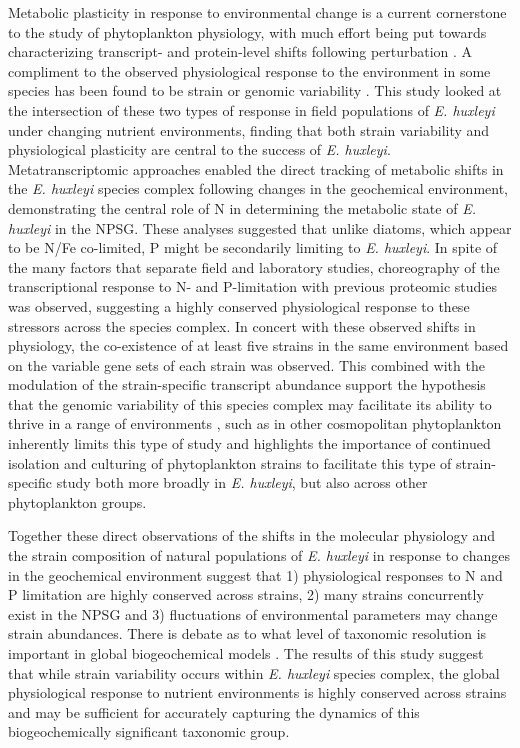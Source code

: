 Metabolic plasticity in response to environmental change is a current cornerstone to the study of phytoplankton physiology, with much effort being put towards characterizing transcript- and protein-level shifts following perturbation \citep{Dyhrman2006, Dyhrman2012, Wurch2011, Bertrand2012a, Jones2013, Bender2014, Frischkorn2014}. A compliment to the observed physiological response to the environment in some species has been found to be strain or genomic variability \citep{Kashtan2014}. This study looked at the intersection of these two types of response in field populations of \textit{E. huxleyi} under changing nutrient environments, finding that both strain variability and physiological plasticity are central to the success of \textit{E. huxleyi}. Metatranscriptomic approaches enabled the direct tracking of metabolic shifts in the \textit{E. huxleyi} species complex following changes in the geochemical environment, demonstrating the central role of N in determining the metabolic state of \textit{E. huxleyi} in the NPSG. These analyses suggested that unlike diatoms, which appear to be N/Fe co-limited, P might be secondarily limiting to \textit{E. huxleyi}. In spite of the many factors that separate field and laboratory studies, choreography of the transcriptional response to N- and P-limitation with previous proteomic studies \citep{McKew2015} was observed, suggesting a highly conserved physiological response to these stressors across the species complex. In concert with these observed shifts in physiology, the co-existence of at least five strains in the same environment based on the variable gene sets of each strain was observed. This combined with the modulation of the strain-specific transcript abundance support the hypothesis that the genomic variability of this species complex may facilitate its ability to thrive in a range of environments \citep{Read2013}, such as in other cosmopolitan phytoplankton \citep{Derelle2006, Johnson2006b} inherently limits this type of study and highlights the importance of continued isolation and culturing of phytoplankton strains to facilitate this type of strain-specific study both more broadly in \textit{E. huxleyi}, but also across other phytoplankton groups. \par
Together these direct observations of the shifts in the molecular physiology and the strain composition of natural populations of \textit{E. huxleyi} in response to changes in the geochemical environment suggest that 1) physiological responses to N and P limitation are highly conserved across strains, 2) many strains concurrently exist in the NPSG and 3) fluctuations of environmental parameters may change strain abundances. There is debate as to what level of taxonomic resolution is important in global biogeochemical models \citep{Follows2011}. The results of this study suggest that while strain variability occurs within \textit{E. huxleyi} species complex, the global physiological response to nutrient environments is highly conserved across strains and may be sufficient for accurately capturing the dynamics of this biogeochemically significant taxonomic group.

